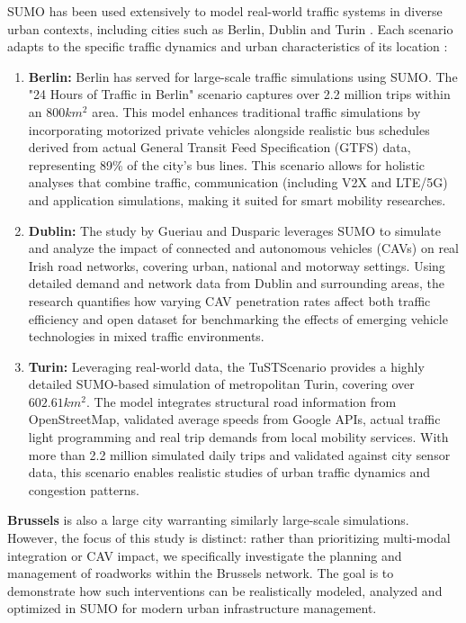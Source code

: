 SUMO has been used extensively to model real-world traffic systems in diverse urban contexts, including cities such as Berlin, Dublin and Turin \cite{SUMO_scenarios}. Each scenario adapts to the specific traffic dynamics and urban characteristics of its location : 
\begin{enumerate}
    \item \textbf{Berlin:} Berlin has served for large-scale traffic simulations using SUMO. The "24 Hours of Traffic in Berlin" scenario captures over 2.2 million trips within an $800km^2$ area. This model enhances traditional traffic simulations by incorporating motorized private vehicles alongside realistic bus schedules derived from actual General Transit Feed Specification (GTFS) data, representing 89\% of the city's bus lines. This scenario allows for holistic analyses that combine traffic, communication (including V2X and LTE/5G) and application simulations, making it suited for smart mobility researches. \cite{berlin_scenario}

    \item \textbf{Dublin:} The study by Gueriau and Dusparic \cite{dublin_scenario} leverages SUMO to simulate and analyze the impact of connected and autonomous vehicles (CAVs) on real Irish road networks, covering urban, national and motorway settings. Using detailed demand and network data from Dublin and surrounding areas, the research quantifies how varying CAV penetration rates affect both traffic efficiency and open dataset for benchmarking the effects of emerging vehicle technologies in mixed traffic environments.

    \item \textbf{Turin:} Leveraging real-world data, the TuSTScenario \cite{turin_scenario} provides a highly detailed SUMO-based simulation of metropolitan Turin, covering over $602.61km^2$. The model integrates structural road information from OpenStreetMap, validated average speeds from Google APIs, actual traffic light programming and real trip demands from local mobility services. With more than 2.2 million simulated daily trips and validated against city sensor data, this scenario enables realistic studies of urban traffic dynamics and congestion patterns.
\end{enumerate}

\textbf{Brussels} is also a large city warranting similarly large-scale simulations. However, the focus of this study is distinct: rather than prioritizing multi-modal integration or CAV impact, we specifically investigate the planning and management of roadworks within the Brussels network. The goal is to demonstrate how such interventions can be realistically modeled, analyzed and optimized in SUMO for modern urban infrastructure management.


